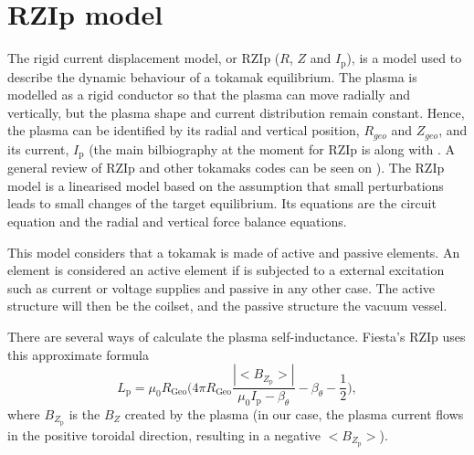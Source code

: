 \documentclass[a4paper,12pt,oneside]{book}
\begin{document}
 
 
 
 
\section{RZIp model}
\label{RZIP, teoria}


The rigid current displacement model, or RZIp ($R$, $Z$ and $I_\text{p}$), is a model used to describe the dynamic behaviour of a tokamak equilibrium. The plasma is modelled as a rigid conductor so that the plasma can move radially and vertically, but the plasma shape and current distribution remain constant. Hence, the plasma can be identified by its radial and vertical position, $R_{geo}$ and $Z_{geo}$, and its current, $I_\text{p}$ (the main bilbiography at the moment for RZIp is \cite{AtiSharmaTesis} along with \cite{Lister_RZIp}. A general review of RZIp and other tokamaks codes can be seen on \cite{Sevillano}). The RZIp model is a linearised model based on the assumption that small perturbations leads to small changes of the target equilibrium. Its equations are the circuit equation and the radial and vertical force balance equations.  %

This model considers that a tokamak is made of active and passive elements. An element is considered an active element if is subjected to a external excitation such as current or voltage supplies and passive in any other case. The active structure will then be the coilset, and the passive structure the vacuum vessel. 

There are several ways of calculate the plasma self-inductance.  Fiesta's RZIp uses this approximate formula \cite{Lister_RZIp}
%
\begin{equation}
L_\text{p}=\mu_0 R_\text{Geo} \Big( 4 \pi R_\text{Geo} \dfrac{|<B_{Z_\text{p}}>|}{\mu_0 I_\text{p}-\beta_\theta}-\beta_\theta -\dfrac{1}{2} \Big),
\end{equation}
where $B_{Z_\text{p}}$ is the $B_Z$ created by the plasma (in our case, the plasma current flows in the positive toroidal direction, resulting in a negative $<B_{Z_\text{p}}>$).
\end{document}
